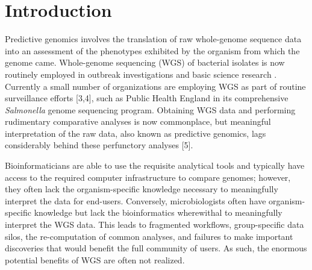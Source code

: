 \documentclass{bmcart}
\begin{document}


\section*{Introduction}
Predictive genomics involves the translation of raw whole-genome sequence data into an assessment of the phenotypes exhibited by the organism from which the genome came. Whole-genome sequencing (WGS) of bacterial isolates is now routinely employed in outbreak investigations and basic science research \cite{reuter_pilot_2013,fittipaldi_integrated_2013}. Currently a small number of organizations are employing WGS as part of routine surveillance efforts [3,4], such as Public Health England in its comprehensive \textit{Salmonella} genome sequencing program. Obtaining WGS data and performing rudimentary comparative analyses is now commonplace, but meaningful interpretation of the raw data, also known as predictive genomics, lags considerably behind these perfunctory analyses [5].

Bioinformaticians are able to use the requisite analytical tools and typically have access to the required computer infrastructure to compare genomes; however, they often lack the organism-specific knowledge necessary to meaningfully interpret the data for end-users. Conversely, microbiologists often have organism-specific knowledge but lack the bioinformatics wherewithal to meaningfully interpret the WGS data. This leads to fragmented workflows, group-specific data silos, the re-computation of common analyses, and failures to make important discoveries that would benefit the full community of users. As such, the enormous potential benefits of WGS are often not realized.
\end{document}
